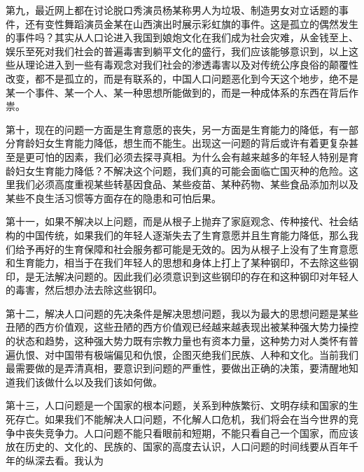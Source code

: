 \documentclass[UTF8,11pt,oneside]{ctexart}
\begin{document}
第九，最近网上都在讨论脱口秀演员杨某称男人为垃圾、制造男女对立话题的事件，还有变性舞蹈演员金某在山西演出时展示彩虹旗的事件。这是孤立的偶然发生的事件吗？其实从人口论进入我国到娘炮文化在我们成为社会灾难，从金钱至上、娱乐至死对我们社会的普遍毒害到躺平文化的盛行，我们应该能够意识到，以上这些从理论进入到一些有毒观念对我们社会的渗透毒害以及对传统公序良俗的颠覆性改变，都不是孤立的，而是有联系的，中国人口问题恶化到今天这个地步，绝不是某一个事件、某一个人、某一种思想所能做到的，而是一种成体系的东西在背后作祟。

第十，现在的问题一方面是生育意愿的丧失，另一方面是生育能力的降低，有一部分育龄妇女生育能力降低，想生而不能生。出现这一问题的背后或许有着更复杂甚至是更可怕的因素，我们必须去探寻真相。为什么会有越来越多的年轻人特别是育龄妇女生育能力降低？不解决这个问题，我们真的可能会面临亡国灭种的危险。这里我们必须高度重视某些转基因食品、某些疫苗、某种药物、某些食品添加剂以及某些不良生活习惯等方面存在的隐患和可怕后果。

第十一，如果不解决以上问题，而是从根子上抛弃了家庭观念、传种接代、社会结构的中国传统，如果我们的年轻人逐渐失去了生育意愿并且生育能力降低，那么我们给予再好的生育保障和社会服务都可能是无效的。因为从根子上没有了生育意愿和生育能力，相当于在我们年轻人的思想和身体上打上了某种钢印，不去除这些钢印，是无法解决问题的。因此我们必须意识到这些钢印的存在和这种钢印对年轻人的毒害，然后想办法去除这些钢印。

第十二，解决人口问题的先决条件是解决思想问题，我以为最大的思想问题是某些丑陋的西方价值观，这些丑陋的西方价值观已经越来越表现出被某种强大势力操控的状态和趋势，这种强大势力既有宗教力量也有资本力量，这种势力对人类怀有普遍仇恨、对中国带有极端偏见和仇恨，企图灭绝我们民族、人种和文化。当前我们最需要做的是弄清真相，要意识到问题的严重性，要做出正确的决策，要清醒地知道我们该做什么以及我们该如何做。

第十三，人口问题是一个国家的根本问题，关系到种族繁衍、文明存续和国家的生死存亡。如果我们不能解决人口问题，不化解人口危机，我们将会在当今世界的竞争中丧失竞争力。人口问题不能只看眼前和短期，不能只看自己一个国家，而应该放在历史的、文化的、民族的、国家的高度去认识，人口问题的时间线要从百年千年的纵深去看。我认为
\end{document}
